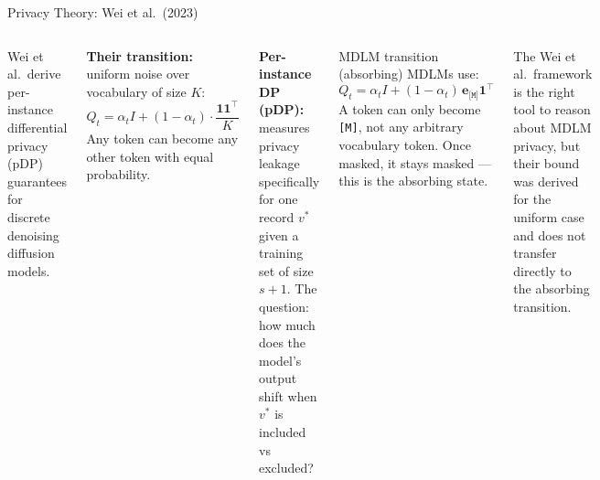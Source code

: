 \documentclass[aspectratio=169,10pt]{beamer}
\newcommand{\MASK}{\texttt{[M]}}
\begin{document}
\begin{frame}[shrink=2]{Privacy Theory: Wei et al.\ (2023)}

\begin{columns}[T]

  Wei et al.\ derive per-instance differential privacy (pDP) guarantees
  for discrete denoising diffusion models.

  \medskip
  \textbf{Their transition:} uniform noise over vocabulary of size $K$:
  \[
    Q_t = \alpha_t I + (1 - \alpha_t) \cdot \frac{\mathbf{1}\mathbf{1}^\top}{K}
  \]
  Any token can become any other token with equal probability.

  \medskip
  \textbf{Per-instance DP (pDP):} measures privacy leakage specifically
  for one record $v^*$ given a training set of size $s+1$. The question:
  how much does the model's output shift when $v^*$ is included vs excluded?

  \begin{block}{MDLM transition (absorbing)}
    MDLMs use:
    \[
      Q_t = \alpha_t I + (1 - \alpha_t)\,\mathbf{e}_{\MASK} \mathbf{1}^\top
    \]
    A token can only become \MASK, not any arbitrary vocabulary token.
    Once masked, it stays masked — this is the absorbing state.
  \end{block}

  \vspace{0.5em}
  The Wei et al.\ framework is the right tool to reason about MDLM
  privacy, but their bound was derived for the uniform case and does not
  transfer directly to the absorbing transition.
\end{columns}

\end{frame}
\end{document}
